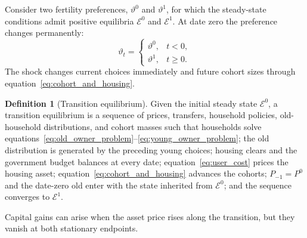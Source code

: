 \documentclass[10pt]{article}
\theoremstyle{definition}
\newtheorem{definition}{Definition}
\begin{document}
Consider two fertility preferences, $\vartheta^0$ and $\vartheta^1$, for which
the steady-state conditions admit positive equilibria $\mathcal E^0$ and
$\mathcal E^1$. At date zero the preference changes permanently:
\begin{equation}
 \vartheta_t=
 \begin{cases}
  \vartheta^0,&t<0,\\
  \vartheta^1,&t\geq0.
 \end{cases}
 \label{eq:preference_shock}
\end{equation}
The shock changes current choices immediately and future cohort sizes through
equation~\eqref{eq:cohort_and_housing}.

\begin{definition}[Transition equilibrium]
Given the initial steady state $\mathcal E^0$, a transition equilibrium is a
sequence of prices, transfers, household policies, old-household distributions,
and cohort masses such that households solve
equations~\eqref{eq:old_owner_problem}--\eqref{eq:young_owner_problem}; the old
distribution is generated by the preceding young choices; housing clears and
the government budget balances at every date; equation~\eqref{eq:user_cost}
prices the housing asset; equation~\eqref{eq:cohort_and_housing} advances the
cohorts; $P_{-1}=P^0$ and the date-zero old enter with the state inherited from
$\mathcal E^0$; and the sequence converges to $\mathcal E^1$.
\end{definition}
Capital gains can arise when the asset price rises along the transition, but
they vanish at both stationary endpoints.
\end{document}

